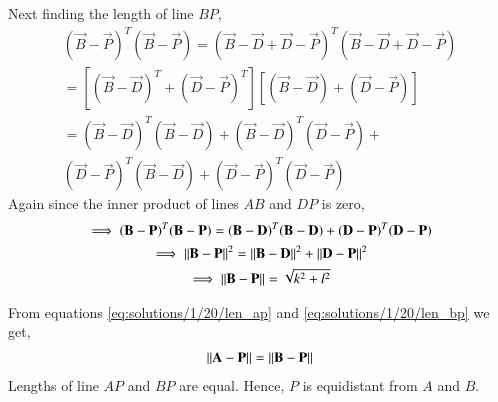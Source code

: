 Next finding the length of line $BP$,
\begin{multline}
    (\vec{B}-\vec{P})^T(\vec{B}-\vec{P}) = (\vec{B}- \vec{D}+\vec{D}-\vec{P})^T(\vec{B}-\vec{D}+\vec{D}-\vec{P}) \\
    =[(\vec{B}-\vec{D})^T+(\vec{D}-\vec{P})^T][(\vec{B}-\vec{D})+(\vec{D}-\vec{P})] \\
    =(\vec{B}-\vec{D})^T(\vec{B}-\vec{D}) + (\vec{B}-\vec{D})^T(\vec{D}-\vec{P}) + \\ (\vec{D}-\vec{P})^T(\vec{B}-\vec{D}) + (\vec{D}-\vec{P})^T(\vec{D}-\vec{P})
\end{multline}
Again since the inner product of lines $AB$ and $DP$ is zero, 
\begin{multline} \label{eq:solutions/1/20/len_bp}
  \implies(\mathbf{B}-\mathbf{P})^T(\mathbf{B}-\mathbf{P}) = (\mathbf{B}-\mathbf{D})^T(\mathbf{B}-\mathbf{D}) + (\mathbf{D}-\mathbf{P})^T(\mathbf{D}-\mathbf{P}) \\
  \implies\left\lVert\mathbf{B}-\mathbf{P}\right\rVert^2 = \left\lVert\mathbf{B}-\mathbf{D}\right\rVert^2 + \left\lVert\mathbf{D}-\mathbf{P}\right\rVert^2 \\
  \implies\left\lVert\mathbf{B}-\mathbf{P}\right\rVert = \sqrt{k^2+l^2}
\end{multline}

From equations \eqref{eq:solutions/1/20/len_ap} and \eqref{eq:solutions/1/20/len_bp} we get, 
\begin{align}
    \left\lVert\mathbf{A}-\mathbf{P}\right\rVert = \left\lVert\mathbf{B}-\mathbf{P}\right\rVert
\end{align}
Lengths of line $AP$ and $BP$ are equal. Hence, $P$ is equidistant from $A$ and $B$. 

